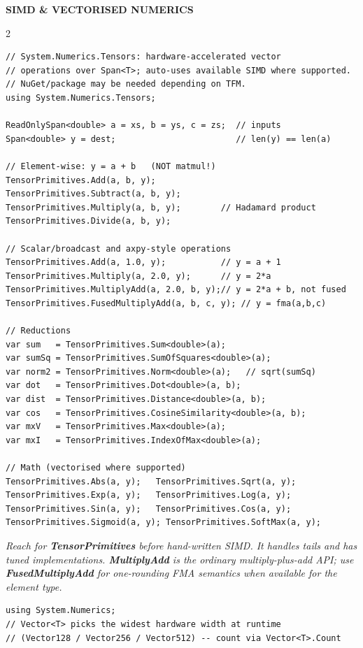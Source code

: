\documentclass[9pt,a4paper]{extarticle}
\newenvironment{card}[3][acBlue]{%
  \begin{tcolorbox}[
    enhanced, colback=#2, colframe=bdCard,
    coltitle=black, colbacktitle=#2!70!bgHdr,
    fonttitle=\bfseries\fontsize{6.16pt}{7.48pt}\selectfont\MakeUppercase,
    title={#3},
    left=3pt, right=2pt, top=1.4pt, bottom=1.8pt,
    toptitle=1pt, bottomtitle=1pt,
    boxrule=0.4pt,
    borderline west={3pt}{0pt}{#1},
    arc=2pt, before skip=0pt, after skip=1.6mm,
    breakable, toprule at break=0pt, bottomrule at break=0pt,
  ]}{\end{tcolorbox}}
\newcommand{\sectionbanner}[1]{%
  \vspace{0.4mm}%
  {\setlength{\fboxsep}{1.5pt}%
   \colorbox{secBg}{\color{white}\bfseries\fontsize{6.6pt}{7.9pt}\selectfont
   \MakeUppercase{\hspace{0.5mm}#1\hspace{0.5mm}}}%
  }\vspace{1.3mm}\par\nobreak}
\newcommand{\code}[1]{{\ttfamily\bfseries #1}}
\newcommand{\note}[1]{\par\noindent
  \begin{minipage}{\linewidth}%
  {\fontsize{5.6pt}{6.8pt}\selectfont\itshape #1}%
  \end{minipage}\par}
\begin{document}
\sectionbanner{SIMD \& Vectorised Numerics}
\begin{multicols}{2}

\begin{card}[acTeal]{bgTeal}{TensorPrimitives --- Use This First}
\begin{lstlisting}[style=cs]
// System.Numerics.Tensors: hardware-accelerated vector
// operations over Span<T>; auto-uses available SIMD where supported.
// NuGet/package may be needed depending on TFM.
using System.Numerics.Tensors;

ReadOnlySpan<double> a = xs, b = ys, c = zs;  // inputs
Span<double> y = dest;                        // len(y) == len(a)

// Element-wise: y = a + b   (NOT matmul!)
TensorPrimitives.Add(a, b, y);
TensorPrimitives.Subtract(a, b, y);
TensorPrimitives.Multiply(a, b, y);        // Hadamard product
TensorPrimitives.Divide(a, b, y);

// Scalar/broadcast and axpy-style operations
TensorPrimitives.Add(a, 1.0, y);           // y = a + 1
TensorPrimitives.Multiply(a, 2.0, y);      // y = 2*a
TensorPrimitives.MultiplyAdd(a, 2.0, b, y);// y = 2*a + b, not fused
TensorPrimitives.FusedMultiplyAdd(a, b, c, y); // y = fma(a,b,c)

// Reductions
var sum   = TensorPrimitives.Sum<double>(a);
var sumSq = TensorPrimitives.SumOfSquares<double>(a);
var norm2 = TensorPrimitives.Norm<double>(a);   // sqrt(sumSq)
var dot   = TensorPrimitives.Dot<double>(a, b);
var dist  = TensorPrimitives.Distance<double>(a, b);
var cos   = TensorPrimitives.CosineSimilarity<double>(a, b);
var mxV   = TensorPrimitives.Max<double>(a);
var mxI   = TensorPrimitives.IndexOfMax<double>(a);

// Math (vectorised where supported)
TensorPrimitives.Abs(a, y);   TensorPrimitives.Sqrt(a, y);
TensorPrimitives.Exp(a, y);   TensorPrimitives.Log(a, y);
TensorPrimitives.Sin(a, y);   TensorPrimitives.Cos(a, y);
TensorPrimitives.Sigmoid(a, y); TensorPrimitives.SoftMax(a, y);
\end{lstlisting}
\note{Reach for \code{TensorPrimitives} before hand-written SIMD. It
handles tails and has tuned implementations. \code{MultiplyAdd} is the
ordinary multiply-plus-add API; use \code{FusedMultiplyAdd} for one-rounding
FMA semantics when available for the element type.}
\end{card}

\begin{card}[acAmber]{bgAmber}{Portable SIMD: Vector\ensuremath{\langle}T\ensuremath{\rangle}}
\begin{lstlisting}[style=cs]
using System.Numerics;
// Vector<T> picks the widest hardware width at runtime
// (Vector128 / Vector256 / Vector512) -- count via Vector<T>.Count


\end{lstlisting}
\end{card}
\end{multicols}
\end{document}
